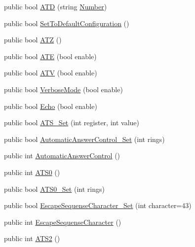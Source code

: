 \begin{DoxyCompactItemize}
\item 
public bool \hyperlink{classedwinspire_1_1_ports_1_1_modem_a73331ff467c61f738f5ea05da85fae5f}{A\-T\-D} (string \hyperlink{namespaceedwinspire_1_1_ports_a22f616818dc85fd8ee4b9f3821546acb}{Number})
\item 
public bool \hyperlink{classedwinspire_1_1_ports_1_1_modem_a3bda0014711d5cb45cd9b701c12feaaa}{Set\-To\-Default\-Configuration} ()
\item 
public bool \hyperlink{classedwinspire_1_1_ports_1_1_modem_ab21deebd05c6f5458698115cc17c338e}{A\-T\-Z} ()
\item 
public bool \hyperlink{classedwinspire_1_1_ports_1_1_modem_aa6b809861a245e102f1a8818c1cc0b9a}{A\-T\-E} (bool enable)
\item 
public bool \hyperlink{classedwinspire_1_1_ports_1_1_modem_ac9c4f895ac77ecf989b078ec431889f6}{A\-T\-V} (bool enable)
\item 
public bool \hyperlink{classedwinspire_1_1_ports_1_1_modem_a9f637839b975c7d8790461440e10abfd}{Verbose\-Mode} (bool enable)
\item 
public bool \hyperlink{classedwinspire_1_1_ports_1_1_modem_abc831121ef3daecbb5af73f33377e503}{Echo} (bool enable)
\item 
public bool \hyperlink{classedwinspire_1_1_ports_1_1_modem_a0dcb64853bb66381778c839c084a684a}{A\-T\-S\-\_\-\-Set} (int register, int value)
\item 
public bool \hyperlink{classedwinspire_1_1_ports_1_1_modem_a1849055f60a2952c00925fc9ed63af09}{Automatic\-Answer\-Control\-\_\-\-Set} (int rings)
\item 
public int \hyperlink{classedwinspire_1_1_ports_1_1_modem_a5fd9a815eef47391dceacff4625bf81b}{Automatic\-Answer\-Control} ()
\item 
public int \hyperlink{classedwinspire_1_1_ports_1_1_modem_aae9d4c012657f7b8bac2c6bacbf0c554}{A\-T\-S0} ()
\item 
public bool \hyperlink{classedwinspire_1_1_ports_1_1_modem_abecdea8422eebb704638d2a8794a8940}{A\-T\-S0\-\_\-\-Set} (int rings)
\item 
public bool \hyperlink{classedwinspire_1_1_ports_1_1_modem_adfb768bf7329f83b0a05a466ad2b093d}{Escape\-Sequense\-Character\-\_\-\-Set} (int character=43)
\item 
public int \hyperlink{classedwinspire_1_1_ports_1_1_modem_ad8eb0150331d38233566baf2c3f61f01}{Escape\-Sequense\-Character} ()
\item 
public int \hyperlink{classedwinspire_1_1_ports_1_1_modem_ae9240432722c25be22605992dd5af85f}{A\-T\-S2} ()

\end{DoxyCompactItemize}
